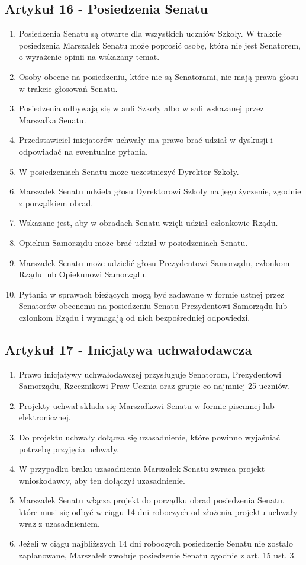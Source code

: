 \documentclass[14pt]{article}
\newenvironment{ustepy}{%
	\begin{enumerate}[leftmargin=1.5em, itemindent=1pt, labelwidth=1em, itemsep=5pt]
	}{%
	\end{enumerate}
}
\begin{document}
\subsection*{Artykuł 16 - Posiedzenia Senatu}
\begin{ustepy}
	\item Posiedzenia Senatu są otwarte dla wszystkich uczniów Szkoły. W trakcie posiedzenia Marszałek Senatu może poprosić osobę, która nie jest Senatorem, o wyrażenie opinii na wskazany temat.
	\item Osoby obecne na posiedzeniu, które nie są Senatorami, nie mają prawa głosu w trakcie głosowań Senatu. 
	\item Posiedzenia odbywają się w auli Szkoły albo w sali wskazanej przez Marszałka Senatu.
	\item Przedstawiciel inicjatorów uchwały ma prawo brać udział w dyskusji i odpowiadać na ewentualne pytania.
	\item W posiedzeniach Senatu może uczestniczyć Dyrektor Szkoły.
	\item Marszałek Senatu udziela głosu Dyrektorowi Szkoły na jego życzenie, zgodnie z porządkiem obrad. 
	\item Wskazane jest, aby w obradach Senatu wzięli udział członkowie Rządu.
	\item Opiekun Samorządu może brać udział w posiedzeniach Senatu.
	\item Marszałek Senatu może udzielić głosu Prezydentowi Samorządu, członkom Rządu lub Opiekunowi Samorządu.
	\item Pytania w sprawach bieżących mogą być zadawane w formie ustnej przez Senatorów obecnemu na posiedzeniu Senatu Prezydentowi Samorządu lub członkom Rządu i wymagają od nich bezpośredniej odpowiedzi.
\end{ustepy}
\subsection*{Artykuł 17 - Inicjatywa uchwałodawcza}
\begin{ustepy}
	\item Prawo inicjatywy uchwałodawczej przysługuje Senatorom, Prezydentowi Samorządu, Rzecznikowi Praw Ucznia oraz grupie co najmniej 25 uczniów.
	\item Projekty uchwał składa się Marszałkowi Senatu w formie pisemnej lub elektronicznej.
	\item Do projektu uchwały dołącza się uzasadnienie, które powinno wyjaśniać potrzebę przyjęcia uchwały.
	\item W przypadku braku uzasadnienia Marszałek Senatu zwraca projekt wnioskodawcy, aby ten dołączył uzasadnienie.
	\item Marszałek Senatu włącza projekt do porządku obrad posiedzenia Senatu, które musi się odbyć w ciągu 14 dni roboczych od złożenia projektu uchwały wraz z uzasadnieniem.
	\item Jeżeli w ciągu najbliższych 14 dni roboczych posiedzenie Senatu nie zostało zaplanowane, Marszałek zwołuje posiedzenie Senatu zgodnie z art. 15 ust. 3.
\end{ustepy}
\newpage
\end{document}
